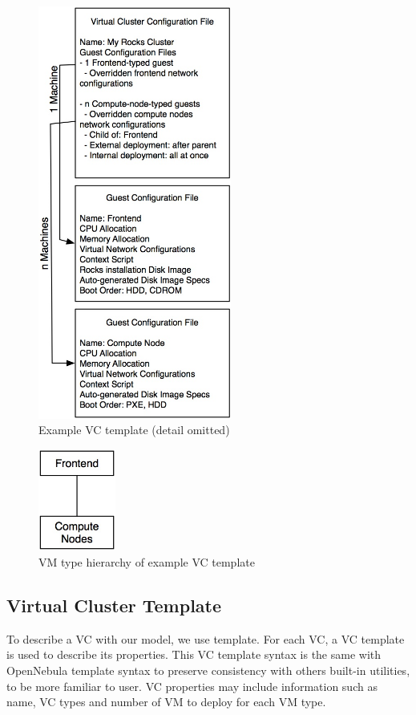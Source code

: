 \documentclass[conference]{IEEEtran}
\begin{document}
\begin{figure}[!t]
\centering
\includegraphics[width=2.5in]{template}
\caption{Example VC template (detail omitted)}
\label{fig:template}
\end{figure}

\begin{figure}[!t]
\centering
\includegraphics[width=1in]{hierarchy}
\caption{VM type hierarchy of example VC template}
\label{fig:hierarchy}
\end{figure}

\subsection{Virtual Cluster Template}
To describe a VC with our model, we use template.
For each VC, a VC template is used to describe its properties.
This VC template syntax is the same with OpenNebula template syntax to preserve consistency with others built-in utilities, to be more familiar to user.
VC properties may include information such as name, VC types and number of VM to deploy for each VM type.
\end{document}
